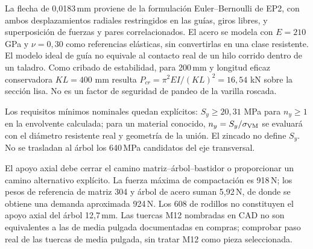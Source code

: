 La flecha de 0,0183\,mm proviene de la formulación Euler--Bernoulli de EP2,
con ambos desplazamientos radiales restringidos en las guías, giros libres,
y superposición de fuerzas y pares correlacionados. El acero se modela
con $E=210$ GPa y $\nu=0,30$ como referencias elásticas, sin convertirlas
en una clase resistente. El modelo ideal de guía no equivale al contacto
real de un hilo corrido dentro de un taladro.
Como cribado de estabilidad, para 200\,mm y longitud eficaz conservadora
$KL=400$ mm resulta $P_{cr}=\pi^2EI/(KL)^2=16,54$ kN sobre la sección lisa.
No es un factor de seguridad de pandeo de la varilla roscada.

Los requisitos mínimos nominales quedan explícitos:
$S_y\geq20,31$ MPa para $n_y\geq1$ en la envolvente calculada;
para un material conocido, $n_y=S_y/\sigma_{\rm VM}$ se evaluará con
el diámetro resistente real y geometría de la unión. El zincado no define
$S_y$. No se trasladan al árbol los 640\,MPa candidatos del eje transversal.

El apoyo axial debe cerrar el camino matriz--árbol--bastidor o proporcionar
un camino alternativo explícito. La fuerza máxima de compactación es 918\,N;
los pesos de referencia de matriz 304 y árbol de acero suman 5,92\,N, de donde
se obtiene una demanda aproximada 924\,N. Los 608 de rodillos no constituyen
el apoyo axial del árbol 12,7\,mm. Las tuercas M12 nombradas en CAD no son
equivalentes a las de media pulgada documentadas en compras; comprobar
paso real de las tuercas de media pulgada, sin tratar M12 como pieza seleccionada.

